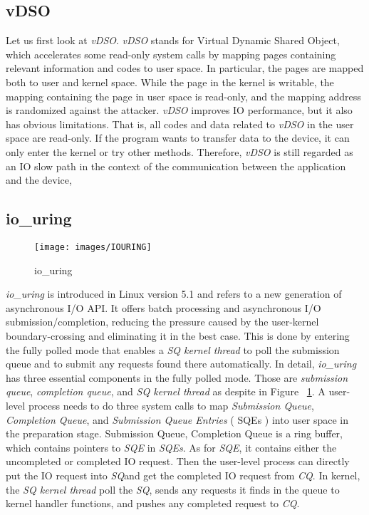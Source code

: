 \subsection{vDSO}

Let us first look at \emph{vDSO}\cite{9}. \emph{vDSO} stands for Virtual Dynamic Shared Object, 
which accelerates some read-only system calls by mapping pages containing 
relevant information and codes to user space. In particular, the pages are 
mapped both to user and kernel space. While the page in the kernel is writable, 
the mapping containing the page in user space is read-only, 
and the mapping address is randomized against the attacker.  
\emph{vDSO} improves IO performance, but it also has obvious limitations. 
That is, all codes and data related to \emph{vDSO} in the user space are read-only. 
If the program wants to transfer data to the device, it can only enter the 
kernel or try other methods. Therefore, \emph{vDSO} is still regarded as an 
IO slow path in the context of the communication  between the application 
and the device,
\subsection{io\_uring}
\begin{figure}[tbp]
  \centering
  \texttt{[image: images/IOURING]}
  \caption[io\_uring]{io\_uring}
  \label{fig:IOURING}
\end{figure}

\emph{io\_uring}\cite{10} is introduced in Linux version 
5.1 and refers to a new generation of asynchronous 
I/O API. It offers batch processing and asynchronous 
I/O submission/completion,  reducing the pressure caused 
by the user-kernel boundary-crossing and eliminating 
it in the best case. This is done by entering the fully 
polled mode that enables a \emph{SQ kernel thread} to poll the 
submission queue and to submit any requests found there 
automatically. In detail, \emph{io\_uring} has three essential 
components in the fully polled mode. Those are \emph{submission queue}, 
\emph{completion queue}, and \emph{SQ kernel thread} as despite in Figure 
~\ref{fig:IOURING}.  A user-level process needs to do three system calls 
to map \emph{Submission Queue}, \emph{Completion Queue}, and 
\emph{Submission Queue Entries} ( SQEs ) into user space in the preparation stage. Submission Queue, 
Completion Queue is a ring buffer, which contains pointers to 
\emph{SQE} in \emph{SQEs}. As for \emph{SQE}, it contains either the uncompleted or completed 
IO request. Then the user-level process can directly put the IO request 
into \emph{SQ}and get the completed IO request from \emph{CQ}. In kernel, 
the \emph{SQ kernel thread} poll the \emph{SQ}, sends any requests it finds in the queue 
to kernel handler functions, and pushes any completed request to \emph{CQ}. 


